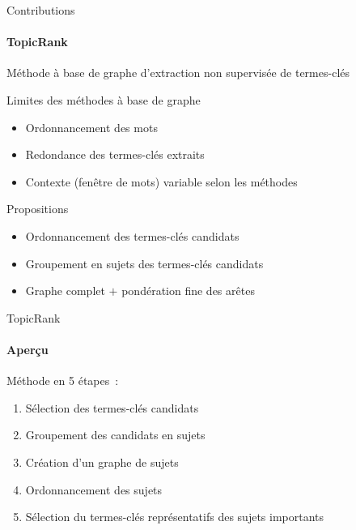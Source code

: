 \begin{frame}{Contributions}\framesubtitle{TopicRank}
  Méthode à base de graphe d'extraction non supervisée de termes-clés

  \vspace{1em}

  \begin{alertblock}{Limites des méthodes à base de graphe}
    \begin{itemize}
      \item{Ordonnancement des mots}
      \item{Redondance des termes-clés extraits}
      \item{Contexte (fenêtre de mots) variable selon les méthodes}
    \end{itemize}
  \end{alertblock}

  \vspace{1em}

  \begin{block}{Propositions}
    \begin{itemize}
      \item{Ordonnancement des termes-clés candidats}
      \item{Groupement en sujets des termes-clés candidats}
      \item{Graphe complet $+$ pondération fine des arêtes}
    \end{itemize}
  \end{block}
\end{frame}

\begin{frame}{TopicRank}\framesubtitle{Aperçu}
  Méthode en 5 étapes~:
  \begin{enumerate}
    \item{Sélection des termes-clés candidats}
    \item{Groupement des candidats en sujets}
    \item{Création d'un graphe de sujets}
    \item{Ordonnancement des sujets}
    \item{Sélection du termes-clés représentatifs des sujets importants}
  \end{enumerate}
\end{frame}

